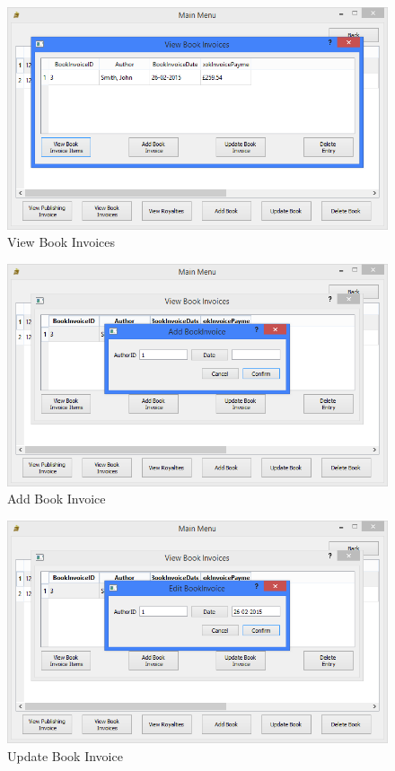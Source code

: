 \begin{figure}[H]
    \caption{View Book Invoices} \label{fig:ViewBookInvoices}
    \includegraphics[width=\textwidth]{./Maintenance/UserInterface/ViewBookInvoices.png}
\end{figure}

\begin{figure}[H]
    \caption{Add Book Invoice} \label{fig:AddBookInvoice}
    \includegraphics[width=\textwidth]{./Maintenance/UserInterface/AddBookInvoice.png}
\end{figure}

\begin{figure}[H]
    \caption{Update Book Invoice} \label{fig:UpdateBookInvoice}
    \includegraphics[width=\textwidth]{./Maintenance/UserInterface/UpdateBookInvoice.png}
\end{figure}

